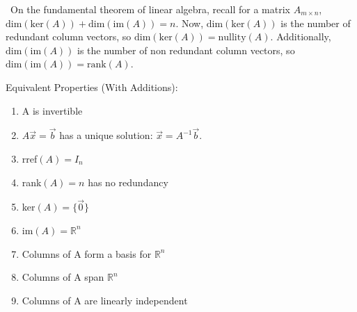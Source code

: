 \documentclass[11 pt]{article}
\begin{document}
$\,\,\,$On the fundamental theorem of linear algebra, recall for a matrix $A_{m\times n}$, $\text{dim}(\text{ker}(A))+\text{dim}(\text{im}(A))=n$. Now, $\text{dim}(\text{ker}(A))$ is the number of redundant column vectors, so $\text{dim}(\text{ker}(A))=\text{nullity}(A)$. Additionally, $\text{dim}(\text{im}(A))$ is the number of non redundant column vectors, so $\text{dim}(\text{im}(A))=\text{rank}(A)$.

\newpage
Equivalent Properties (With Additions):
\begin{enumerate}
\item A is invertible
\item $A\vec{x}=\vec{b}$ has a unique solution: $\vec{x}=A^{-1}\vec{b}$.
\item rref$(A)=I_n$
\item rank$(A)=n$ has no redundancy
\item ker$(A)=\{\vec{0}\}$
\item im$(A)=\mathbb{R}^n$
\item Columns of A form a basis for $\mathbb{R}^n$
\item Columns of A span $\mathbb{R}^n$
\item Columns of A are linearly independent
\end{enumerate}
\end{document}
